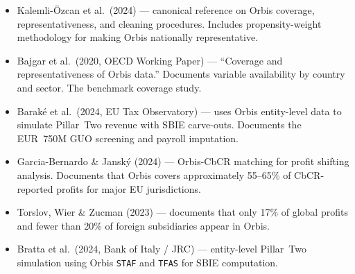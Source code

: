 \documentclass[11pt,a4paper]{article}
\newcommand{\field}[1]{\texttt{#1}}
\begin{document}
\begin{itemize}[noitemsep]
  \item Kalemli-\"Ozcan et al.\ (2024) --- canonical reference on Orbis coverage, representativeness, and cleaning procedures. Includes propensity-weight methodology for making Orbis nationally representative.
  \item Bajgar et al.\ (2020, OECD Working Paper) --- ``Coverage and representativeness of Orbis data.'' Documents variable availability by country and sector. The benchmark coverage study.
  \item Barak\'e et al.\ (2024, EU Tax Observatory) --- uses Orbis entity-level data to simulate Pillar~Two revenue with SBIE carve-outs. Documents the EUR~750M GUO screening and payroll imputation.
  \item Garcia-Bernardo \& Jansk\'y (2024) --- Orbis-CbCR matching for profit shifting analysis. Documents that Orbis covers approximately 55--65\% of CbCR-reported profits for major EU jurisdictions.
  \item Torslov, Wier \& Zucman (2023) --- documents that only 17\% of global profits and fewer than 20\% of foreign subsidiaries appear in Orbis.
  \item Bratta et al.\ (2024, Bank of Italy / JRC) --- entity-level Pillar~Two simulation using Orbis \field{STAF} and \field{TFAS} for SBIE computation.
\end{itemize}
\end{document}
